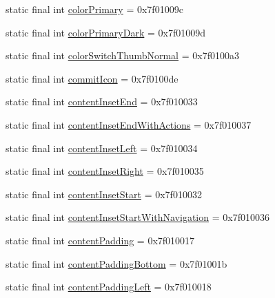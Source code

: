 \begin{CompactItemize}
\item 
static final int \hyperlink{classandroid_1_1support_1_1v7_1_1appcompat_1_1_r_1_1attr_90742f1c4091e0ed06f41d54876c6e13}{colorPrimary} = 0x7f01009c
\item 
static final int \hyperlink{classandroid_1_1support_1_1v7_1_1appcompat_1_1_r_1_1attr_ac95916a09ab377adb70d7d3473f7197}{colorPrimaryDark} = 0x7f01009d
\item 
static final int \hyperlink{classandroid_1_1support_1_1v7_1_1appcompat_1_1_r_1_1attr_bb317034e010a342de067aea45c520e8}{colorSwitchThumbNormal} = 0x7f0100a3
\item 
static final int \hyperlink{classandroid_1_1support_1_1v7_1_1appcompat_1_1_r_1_1attr_9c7dd34c644affe3a22ae9cb654354c5}{commitIcon} = 0x7f0100de
\item 
static final int \hyperlink{classandroid_1_1support_1_1v7_1_1appcompat_1_1_r_1_1attr_f84368a64f2f72fdddac19c472509446}{contentInsetEnd} = 0x7f010033
\item 
static final int \hyperlink{classandroid_1_1support_1_1v7_1_1appcompat_1_1_r_1_1attr_7b7dd8edc3e48921cf2e6c01468c8459}{contentInsetEndWithActions} = 0x7f010037
\item 
static final int \hyperlink{classandroid_1_1support_1_1v7_1_1appcompat_1_1_r_1_1attr_0092c16e514b074aa8a3947fdd0bf4ce}{contentInsetLeft} = 0x7f010034
\item 
static final int \hyperlink{classandroid_1_1support_1_1v7_1_1appcompat_1_1_r_1_1attr_ad98300ae474b2854f159d4c8dadb7bf}{contentInsetRight} = 0x7f010035
\item 
static final int \hyperlink{classandroid_1_1support_1_1v7_1_1appcompat_1_1_r_1_1attr_dd1a34ba2e76a0ec5875d2b9e30590cd}{contentInsetStart} = 0x7f010032
\item 
static final int \hyperlink{classandroid_1_1support_1_1v7_1_1appcompat_1_1_r_1_1attr_1f2199e61f5f1b097d142fe2d80191ac}{contentInsetStartWithNavigation} = 0x7f010036
\item 
static final int \hyperlink{classandroid_1_1support_1_1v7_1_1appcompat_1_1_r_1_1attr_b21cc6fefb329f4e67d140c836cede25}{contentPadding} = 0x7f010017
\item 
static final int \hyperlink{classandroid_1_1support_1_1v7_1_1appcompat_1_1_r_1_1attr_83c13e0c0ea42b6b41e092a2805d4531}{contentPaddingBottom} = 0x7f01001b
\item 
static final int \hyperlink{classandroid_1_1support_1_1v7_1_1appcompat_1_1_r_1_1attr_0a95570e618859c205ffbea644dd70d1}{contentPaddingLeft} = 0x7f010018
\item 

\end{CompactItemize}
